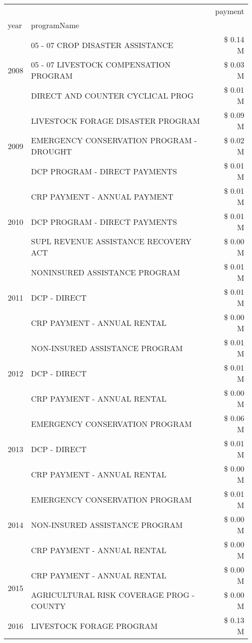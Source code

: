 \begin{tabular}{llr}
\toprule
 &  & payment \\
year & programName &  \\
\midrule
\multirow[t]{3}{*}{2008} & 05 - 07 CROP DISASTER ASSISTANCE & \$ 0.14 M \\
 & 05 - 07 LIVESTOCK COMPENSATION PROGRAM & \$ 0.03 M \\
 & DIRECT AND COUNTER CYCLICAL PROG & \$ 0.01 M \\
\cline{1-3}
\multirow[t]{3}{*}{2009} & LIVESTOCK FORAGE DISASTER  PROGRAM & \$ 0.09 M \\
 & EMERGENCY CONSERVATION PROGRAM - DROUGHT & \$ 0.02 M \\
 & DCP PROGRAM - DIRECT PAYMENTS & \$ 0.01 M \\
\cline{1-3}
\multirow[t]{3}{*}{2010} & CRP PAYMENT - ANNUAL PAYMENT & \$ 0.01 M \\
 & DCP PROGRAM - DIRECT PAYMENTS & \$ 0.01 M \\
 & SUPL REVENUE ASSISTANCE RECOVERY ACT & \$ 0.00 M \\
\cline{1-3}
\multirow[t]{3}{*}{2011} & NONINSURED ASSISTANCE PROGRAM & \$ 0.01 M \\
 & DCP - DIRECT & \$ 0.01 M \\
 & CRP PAYMENT - ANNUAL RENTAL & \$ 0.00 M \\
\cline{1-3}
\multirow[t]{3}{*}{2012} & NON-INSURED ASSISTANCE PROGRAM & \$ 0.01 M \\
 & DCP - DIRECT & \$ 0.01 M \\
 & CRP PAYMENT - ANNUAL RENTAL & \$ 0.00 M \\
\cline{1-3}
\multirow[t]{3}{*}{2013} & EMERGENCY CONSERVATION PROGRAM & \$ 0.06 M \\
 & DCP - DIRECT & \$ 0.01 M \\
 & CRP PAYMENT - ANNUAL RENTAL & \$ 0.00 M \\
\cline{1-3}
\multirow[t]{3}{*}{2014} & EMERGENCY CONSERVATION PROGRAM & \$ 0.01 M \\
 & NON-INSURED ASSISTANCE PROGRAM & \$ 0.00 M \\
 & CRP PAYMENT - ANNUAL RENTAL & \$ 0.00 M \\
\cline{1-3}
\multirow[t]{2}{*}{2015} & CRP PAYMENT - ANNUAL RENTAL & \$ 0.00 M \\
 & AGRICULTURAL RISK COVERAGE PROG - COUNTY & \$ 0.00 M \\
\cline{1-3}
\multirow[t]{3}{*}{2016} & LIVESTOCK FORAGE PROGRAM                      & \$ 0.13 M \\

\end{tabular}
